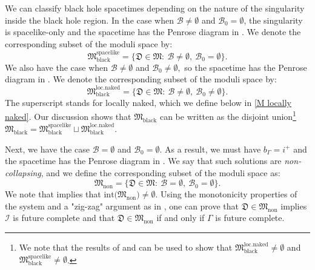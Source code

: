 \documentclass[11pt]{article}
\numberwithin{equation}{section}
\begin{document}
We can classify black hole spacetimes depending on the nature of the singularity inside the black hole region. In the case when $\mathcal{B}\neq\emptyset$ and $\mathcal{B}_0=\emptyset$, the singularity is spacelike-only and the spacetime has the Penrose diagram in .  We denote the corresponding subset of the moduli space by:
\begin{equation}\label{M black spacelike}
    \mathfrak{M}_{\mathrm{black}}^{\mathrm{spacelike}}=\big\{\mathfrak{D}\in\mathfrak{M}:\ \mathcal{B}\neq\emptyset,\ \mathcal{B}_0=\emptyset\big\}.
\end{equation}
We also have the case when $\mathcal{B}\neq\emptyset$ and $\mathcal{B}_0\neq\emptyset,$ so the spacetime has the Penrose diagram in .  We denote the corresponding subset of the moduli space by:
\begin{equation}\label{M black loc naked}
    \mathfrak{M}_{\mathrm{black}}^{\mathrm{loc.naked}}=\big\{\mathfrak{D}\in\mathfrak{M}:\ \mathcal{B}\neq\emptyset,\ \mathcal{B}_0\neq\emptyset\big\}.
\end{equation}
The superscript stands for locally naked, which we define below in \eqref{M locally naked}. Our discussion shows that $\mathfrak{M}_{\mathrm{black}}$ can be written as the disjoint union\footnote{We note that the results of  and \cite{preparation} can be used to show that $\mathfrak{M}_{\mathrm{black}}^{\mathrm{loc.naked}}\neq\emptyset$ and $\mathfrak{M}_{\mathrm{black}}^{\mathrm{spacelike}}\neq\emptyset$.} $\mathfrak{M}_{\mathrm{black}}=\mathfrak{M}_{\mathrm{black}}^{\mathrm{spacelike}}\sqcup\mathfrak{M}_{\mathrm{black}}^{\mathrm{loc.naked}}.$

Next, we have the case $\mathcal{B}=\emptyset$ and $\mathcal{B}_0=\emptyset$. As a result, we must have $b_{\Gamma}=i^+$ and the spacetime has the Penrose diagram in . We say that such solutions are \textit{non-collapsing}, and we define the corresponding subset of the moduli space as:
\begin{equation}\label{M non}
    \mathfrak{M}_{\mathrm{non}}=\big\{\mathfrak{D}\in\mathfrak{M}:\ \mathcal{B}=\emptyset,\ \mathcal{B}_0=\emptyset\big\}.
\end{equation}
We note that  implies that $\mathrm{int}\big(\mathfrak{M}_{\mathrm{non}}\big)\neq\emptyset.$ Using the monotonicity properties of the system and a "zig-zag" argument as in \cite[Section~3]{SchwAdS}, one can prove that $\mathfrak{D}\in\mathfrak{M}_{\mathrm{non}}$ implies $\mathcal{I}$ is future complete and that $\mathfrak{D}\in\mathfrak{M}_{\mathrm{non}}$ if and only if $\Gamma$ is future complete.
\end{document}
